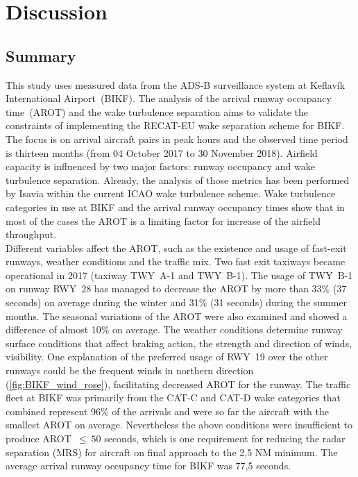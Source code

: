


\chapter{Discussion}\label{cha:discussion}

\section{Summary}\label{sec:summary}
This study uses measured data from the ADS-B surveillance system at Keflavík International Airport~(BIKF). The analysis of the arrival runway occupancy time~(AROT) and the wake turbulence separation aims to validate the constraints of implementing the RECAT-EU wake  separation scheme for BIKF. The focus is on arrival aircraft pairs in peak hours and the observed time period is thirteen months (from 04 October 2017 to 30 November 2018). 
Airfield capacity is influenced by two major factors: runway occupancy and wake turbulence separation. Already, the analysis of those metrics has been performed by Isavia within the current ICAO wake turbulence scheme. Wake turbulence categories in use at BIKF and the arrival runway occupancy times show that in most of the cases the AROT is a limiting factor for increase of the airfield throughput.  \\
Different variables affect the AROT, such as the existence and usage of fast-exit runways, weather conditions and the traffic mix. Two fast exit taxiways became operational in 2017 (taxiway TWY~A-1 and TWY~B-1). The usage of TWY~B-1 on runway RWY~28 has managed to decrease the AROT by more than 33\% (37 seconds) on average during the winter and 31\% (31 seconds) during the summer months. The seasonal variations of the AROT were also examined and showed a difference of almost 10\% on average. The weather conditions determine runway surface conditions that affect braking action, the strength and direction of winds, visibility. One explanation of the preferred usage of RWY~19 over the other runways could be the frequent winds in northern direction (\ref{fig:BIKF_wind_rose}), facilitating decreased AROT for the runway. The traffic fleet at BIKF was primarily from the CAT-C and CAT-D wake categories that combined represent 96\% of the arrivals and were so far the aircraft with the smallest AROT on average. Nevertheless the above conditions were insufficient to produce AROT~$\leq~50$ seconds, which is one requirement for reducing the radar separation (MRS) for aircraft on final approach to the 2,5 NM minimum. The average arrival runway occupancy time for BIKF was 77,5 seconds. \\
